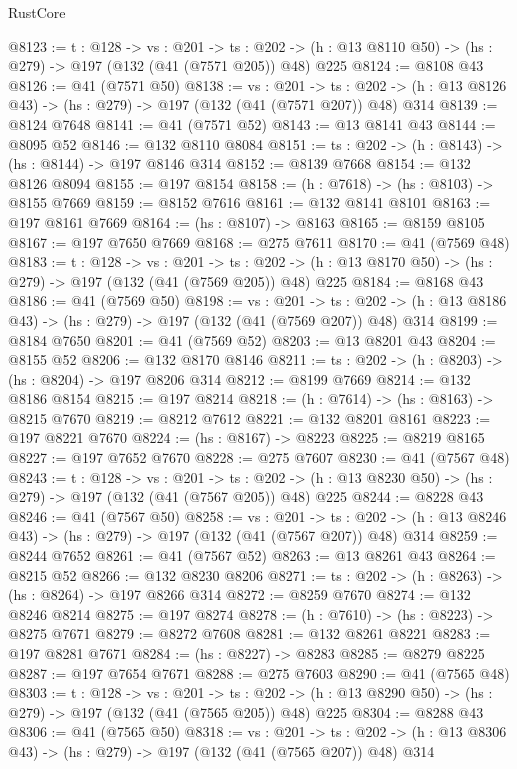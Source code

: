 \begin{lexlean}{RustCore}
\begin{coremodule}
@8123 := {t : @128} ->
  {vs : @201} ->
  {ts : @202} -> (h : @13 @8110 @50) -> (hs : @279) -> @197 (@132 (@41 (@7571 @205)) @48) @225
@8124 := @8108 @43
@8126 := @41 (@7571 @50)
@8138 := {vs : @201} ->
  {ts : @202} -> (h : @13 @8126 @43) -> (hs : @279) -> @197 (@132 (@41 (@7571 @207)) @48) @314
@8139 := @8124 @7648
@8141 := @41 (@7571 @52)
@8143 := @13 @8141 @43
@8144 := @8095 @52
@8146 := @132 @8110 @8084
@8151 := {ts : @202} -> (h : @8143) -> (hs : @8144) -> @197 @8146 @314
@8152 := @8139 @7668
@8154 := @132 @8126 @8094
@8155 := @197 @8154
@8158 := (h : @7618) -> (hs : @8103) -> @8155 @7669
@8159 := @8152 @7616
@8161 := @132 @8141 @8101
@8163 := @197 @8161 @7669
@8164 := (hs : @8107) -> @8163
@8165 := @8159 @8105
@8167 := @197 @7650 @7669
@8168 := @275 @7611
@8170 := @41 (@7569 @48)
@8183 := {t : @128} ->
  {vs : @201} ->
  {ts : @202} -> (h : @13 @8170 @50) -> (hs : @279) -> @197 (@132 (@41 (@7569 @205)) @48) @225
@8184 := @8168 @43
@8186 := @41 (@7569 @50)
@8198 := {vs : @201} ->
  {ts : @202} -> (h : @13 @8186 @43) -> (hs : @279) -> @197 (@132 (@41 (@7569 @207)) @48) @314
@8199 := @8184 @7650
@8201 := @41 (@7569 @52)
@8203 := @13 @8201 @43
@8204 := @8155 @52
@8206 := @132 @8170 @8146
@8211 := {ts : @202} -> (h : @8203) -> (hs : @8204) -> @197 @8206 @314
@8212 := @8199 @7669
@8214 := @132 @8186 @8154
@8215 := @197 @8214
@8218 := (h : @7614) -> (hs : @8163) -> @8215 @7670
@8219 := @8212 @7612
@8221 := @132 @8201 @8161
@8223 := @197 @8221 @7670
@8224 := (hs : @8167) -> @8223
@8225 := @8219 @8165
@8227 := @197 @7652 @7670
@8228 := @275 @7607
@8230 := @41 (@7567 @48)
@8243 := {t : @128} ->
  {vs : @201} ->
  {ts : @202} -> (h : @13 @8230 @50) -> (hs : @279) -> @197 (@132 (@41 (@7567 @205)) @48) @225
@8244 := @8228 @43
@8246 := @41 (@7567 @50)
@8258 := {vs : @201} ->
  {ts : @202} -> (h : @13 @8246 @43) -> (hs : @279) -> @197 (@132 (@41 (@7567 @207)) @48) @314
@8259 := @8244 @7652
@8261 := @41 (@7567 @52)
@8263 := @13 @8261 @43
@8264 := @8215 @52
@8266 := @132 @8230 @8206
@8271 := {ts : @202} -> (h : @8263) -> (hs : @8264) -> @197 @8266 @314
@8272 := @8259 @7670
@8274 := @132 @8246 @8214
@8275 := @197 @8274
@8278 := (h : @7610) -> (hs : @8223) -> @8275 @7671
@8279 := @8272 @7608
@8281 := @132 @8261 @8221
@8283 := @197 @8281 @7671
@8284 := (hs : @8227) -> @8283
@8285 := @8279 @8225
@8287 := @197 @7654 @7671
@8288 := @275 @7603
@8290 := @41 (@7565 @48)
@8303 := {t : @128} ->
  {vs : @201} ->
  {ts : @202} -> (h : @13 @8290 @50) -> (hs : @279) -> @197 (@132 (@41 (@7565 @205)) @48) @225
@8304 := @8288 @43
@8306 := @41 (@7565 @50)
@8318 := {vs : @201} ->
  {ts : @202} -> (h : @13 @8306 @43) -> (hs : @279) -> @197 (@132 (@41 (@7565 @207)) @48) @314

\end{coremodule}
\end{lexlean}
